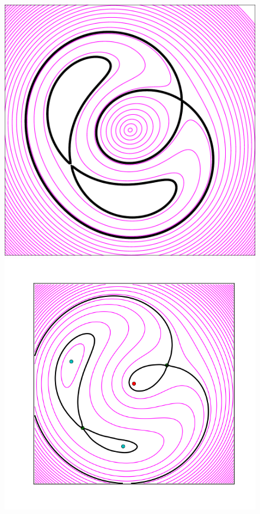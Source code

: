 \begin{figure}
  \includegraphics[width=\myplotswidth]{fig/ASW0004oux_006990_arriv}
  \includegraphics[width=\myplotswidth]{fig/006990_spaghetti} \\

\end{figure}
